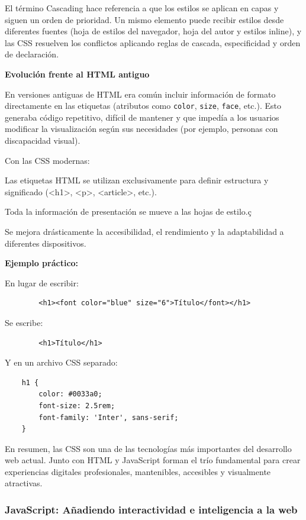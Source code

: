\documentclass[11.5pt]{article}
\begin{document}
	El término Cascading hace referencia a que los estilos se aplican en capas y siguen un orden de prioridad. Un mismo elemento puede recibir estilos desde diferentes fuentes (hoja de estilos del navegador, hoja del autor y estilos inline), y las CSS resuelven los conflictos aplicando reglas de cascada, especificidad y orden de declaración.
	
	\noindent\textbf{{\large Evolución frente al HTML antiguo}}
	
	En versiones antiguas de HTML era común incluir información de formato directamente en las etiquetas (atributos como \verb|color|, \verb|size|, \verb|face|, etc.). Esto generaba código repetitivo, difícil de mantener y que impedía a los usuarios modificar la visualización según sus necesidades (por ejemplo, personas con discapacidad visual).
	
	Con las CSS modernas:
	
	Las etiquetas HTML se utilizan exclusivamente para definir estructura y significado (<h1>, <p>, <article>, etc.).
	
	Toda la información de presentación se mueve a las hojas de estilo.ç
	
	Se mejora drásticamente la accesibilidad, el rendimiento y la adaptabilidad a diferentes dispositivos.
	
	\noindent\textbf{Ejemplo práctico:}
	
	En lugar de escribir:
	
	\begin{verbatim}
		<h1><font color="blue" size="6">Título</font></h1>
	\end{verbatim}
	
	Se escribe:
	
	\begin{verbatim}
		<h1>Título</h1>
	\end{verbatim}
	
	Y en un archivo CSS separado:
	
	\begin{verbatim}
	h1 {
		color: #0033a0;
		font-size: 2.5rem;
		font-family: 'Inter', sans-serif;
	}
	\end{verbatim}
	
	En resumen, las CSS son una de las tecnologías más importantes del desarrollo web actual. Junto con HTML y JavaScript forman el trío fundamental para crear experiencias digitales profesionales, mantenibles, accesibles y visualmente atractivas.
	
	\subsubsection{JavaScript: Añadiendo interactividad e inteligencia a la web}
	
\end{document}
